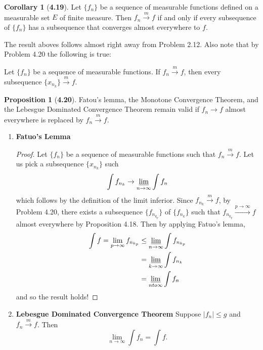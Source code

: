 \documentclass[12pt]{article}
\newcommand{\toM}{\overset{m}{\to}}
\theoremstyle{definition}
\newtheorem*{cor}{Corollary}
\newtheorem*{prop}{Proposition}
\begin{document}
\begin{cor}[\textbf{4.19}]

    Let \( \{f_n\} \) be a sequence of measurable functions defined on a measurable set \( E \) of finite measure. Then \( {f_n} \toM  f \) if and only if every subsequence of \( \{f_n\} \) has a subsequence that converges almost everywhere to \( f \).
    
\end{cor}

The result aboves follows almost right away from Problem 2.12. Also note that by Problem 4.20 the following is true:

    Let \( \{f_n\} \) be a sequence of measurable functions. 
    If \( f_n \toM f \), then every subsequence \( \{x_{n_{k}}\} \toM f \).

\begin{prop}[\textbf{4.20}]

    Fatou's lemma, the Monotone Convergence Theorem, and the Lebesgue Dominated Convergence Theorem remain valid 
    if \( f_n \to f \) almost everywhere is replaced by \( f_n \toM f \).

    \begin{enumerate}[label = (\arabic{*})]
        \item \textbf{Fatuo's Lemma}
            \begin{proof}
            Let \( \{f_n\} \) be a sequence of measurable functions such that \( f_n \toM f \). 
            Let us pick a subsequence \( \{x_{n_{k}} \} \) such 
                    \[
                        \int f_{n_{k}} \to \varliminf_{n \to \infty} \int f_{n}
                    \]
                which follows by the definition of the limit inferior.  
                Since \(  f_{n_{k}} \toM f \), by Problem 4.20, there exists a subsequence \( \{ f_{n_{k_{p}}}\}\) of \( \{f_{n_{k}}\}\) such that \( f_{n_{k_{p}}} \overset{p \to \infty}{\to} f \) almost everywhere by Proposition 4.18. Then by applying Fatuo's lemma,
                    \begin{align*}
                        \int f = \lim_{p \to \infty} f_{n_{k_{p}}} & \leq \varliminf_{n \to \infty} \int f_{n_{k_{p}}} \\
                        &= \varliminf_{k \to \infty} \int f_{n_{k}} \\
                        &= \varliminf_{n to \infty} \int f_{n}
                    \end{align*}
                and so the result holds!
            \end{proof}
        \item \textbf{Lebesgue Dominated Convergence Theorem} Suppose \( |f_n| \leq g \) and \( f_n \toM f \). Then 
            \[
              \lim_{n \to \infty} \int f_n = \int f.   
            \]
        

\end{enumerate}
\end{prop}
\end{document}
